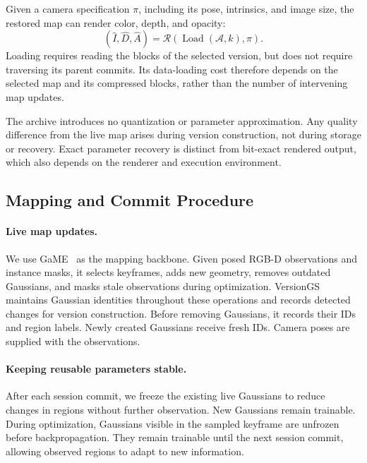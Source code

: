 Given a camera specification $\pi$, including its pose, intrinsics,
and image size, the restored map can render color, depth, and opacity:
\begin{equation}
    (\hat{I},\hat{D},\hat{A})
    =
    \mathcal{R}\!\left(
        \operatorname{Load}(\mathcal{A},k),\pi
    \right).
\end{equation}
Loading requires reading the blocks of the selected version,
but does not require traversing its parent commits.
Its data-loading cost therefore depends on the selected map
and its compressed blocks, rather than the number of intervening
map updates.

The archive introduces no quantization or parameter approximation.
Any quality difference from the live map arises during version
construction, not during storage or recovery.
Exact parameter recovery is distinct from bit-exact rendered output,
which also depends on the renderer and execution environment.


\subsection{Mapping and Commit Procedure}
\label{sec:mapping_procedure}

\paragraph{Live map updates.}
We use GaME~\cite{yugay2026game} as the mapping backbone.
Given posed RGB-D observations and instance masks, it selects
keyframes, adds new geometry, removes outdated Gaussians,
and masks stale observations during optimization.
VersionGS maintains Gaussian identities throughout these operations
and records detected changes for version construction.
Before removing Gaussians, it records their IDs and region labels.
Newly created Gaussians receive fresh IDs.
Camera poses are supplied with the observations.

\paragraph{Keeping reusable parameters stable.}
After each session commit, we freeze the existing live Gaussians
to reduce changes in regions without further observation.
New Gaussians remain trainable.
During optimization, Gaussians visible in the sampled keyframe
are unfrozen before backpropagation.
They remain trainable until the next session commit,
allowing observed regions to adapt to new information.

